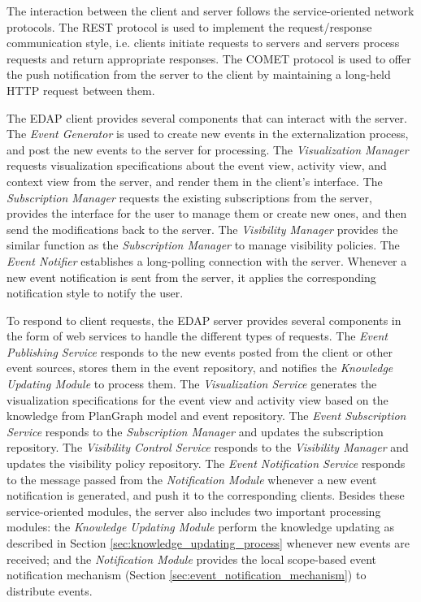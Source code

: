The interaction between the client and server follows the service-oriented network protocols. The REST protocol is used to implement the request/response communication style, i.e. clients initiate requests to servers and servers process requests and return appropriate responses. The COMET protocol is used to offer the push notification from the server to the client by maintaining a long-held HTTP request between them. 

The EDAP client provides several components that can interact with the server. The \emph{Event Generator} is used to create new events in the externalization process, and post the new events to the server for processing. The \emph{Visualization Manager} requests visualization specifications about the event view, activity view, and context view from the server, and render them in the client's interface. The \emph{Subscription Manager} requests the existing subscriptions from the server, provides the interface for the user to manage them or create new ones, and then send the modifications back to the server. The \emph{Visibility Manager} provides the similar function as the \emph{Subscription Manager} to manage visibility policies. The \emph{Event Notifier} establishes a long-polling connection with the server. Whenever a new event notification is sent from the server, it applies the corresponding notification style to notify the user. 

To respond to client requests, the EDAP server provides several components in the form of web services to handle the different types of requests. The \emph{Event Publishing Service} responds to the new events posted from the client or other event sources, stores them in the event repository, and notifies the \emph{Knowledge Updating Module} to process them. The \emph{Visualization Service} generates the visualization specifications for the event view and activity view based on the knowledge from PlanGraph model and event repository. The \emph{Event Subscription Service} responds to the \emph{Subscription Manager} and updates the subscription repository. The \emph{Visibility Control Service} responds to the \emph{Visibility Manager} and updates the visibility policy repository. The \emph{Event Notification Service} responds to the message passed from the \emph{Notification Module} whenever a new event notification is generated, and push it to the corresponding clients. Besides these service-oriented modules, the server also includes two important processing modules: the \emph{Knowledge Updating Module} perform the knowledge updating as described in Section \ref{sec:knowledge_updating_process} whenever new events are received; and the \emph{Notification Module} provides the local scope-based event notification mechanism (Section \ref{sec:event_notification_mechanism}) to distribute events. 

